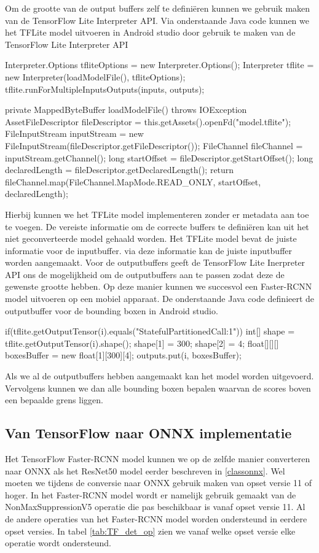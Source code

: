 Om de grootte van de output buffers zelf te defini\"eren kunnen we gebruik maken van de TensorFlow Lite Interpreter API.
Via onderstaande Java code kunnen we het TFLite model uitvoeren in Android studio door gebruik te maken van de TensorFlow Lite Interpreter API

\begin{python}
Interpreter.Options tfliteOptions = new Interpreter.Options();
Interpreter tflite = new Interpreter(loadModelFile(), tfliteOptions);
tflite.runForMultipleInputsOutputs(inputs, outputs);

private MappedByteBuffer loadModelFile() throws IOException {
    AssetFileDescriptor fileDescriptor = this.getAssets().openFd("model.tflite");
    FileInputStream inputStream = new FileInputStream(fileDescriptor.getFileDescriptor());
    FileChannel fileChannel = inputStream.getChannel();
    long startOffset = fileDescriptor.getStartOffset();
    long declaredLength = fileDescriptor.getDeclaredLength();
    return fileChannel.map(FileChannel.MapMode.READ_ONLY, startOffset, declaredLength);
}
\end{python}

Hierbij kunnen we het TFLite model implementeren zonder er metadata aan toe te voegen.
De vereiste informatie om de correcte buffers te defini\"eren kan uit het niet geconverteerde model gehaald worden.
Het TFLite model bevat de juiste informatie voor de inputbuffer.
via deze informatie kan de juiste inputbuffer worden aangemaakt.
Voor de outputbuffers geeft de TensorFlow Lite Inerpreter API ons de mogelijkheid om de outputbuffers aan te passen zodat deze de gewenste grootte hebben.
Op deze manier kunnen we succesvol een Faster-RCNN model uitvoeren op een mobiel apparaat.
De onderstaande Java code definieert de outputbuffer voor de bounding boxen in Android studio.

\begin{python}
if(tflite.getOutputTensor(i).equals("StatefulPartitionedCall:1")) {
    int[] shape = tflite.getOutputTensor(i).shape();
    shape[1] = 300;
    shape[2] = 4;
    float[][][] boxesBuffer = new float[1][300][4];
    outputs.put(i, boxesBuffer);
}
\end{python}

Als we al de outputbuffers hebben aangemaakt kan het model worden uitgevoerd.
Vervolgens kunnen we dan alle bounding boxen bepalen waarvan de scores boven een bepaalde grens liggen.

\subsection{Van TensorFlow naar ONNX implementatie}
Het TensorFlow Faster-RCNN model kunnen we op de zelfde manier converteren naar ONNX als het ResNet50 model eerder beschreven in \ref{classonnx}.
Wel moeten we tijdens de conversie naar ONNX gebruik maken van opset versie 11 of hoger.
In het Faster-RCNN model wordt er namelijk gebruik gemaakt van de NonMaxSuppressionV5 operatie die pas beschikbaar is vanaf opset versie 11.
Al de andere operaties van het Faster-RCNN model worden ondersteund in eerdere opset versies.
In tabel \ref{tab:TF_det_op} zien we vanaf welke opset versie elke operatie wordt ondersteund.

